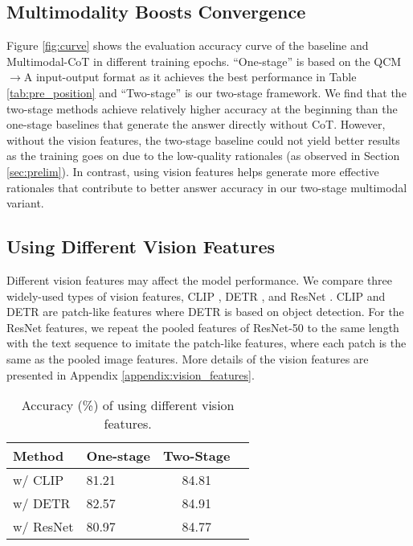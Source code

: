 \documentclass[nohyperref]{article}
\theoremstyle{plain}
\theoremstyle{definition}
\theoremstyle{remark}
\begin{document}
\subsection{Multimodality Boosts Convergence}
Figure \ref{fig:curve} shows the evaluation accuracy curve of the baseline and Multimodal-CoT in different training epochs. {``One-stage'' is based on the QCM$\rightarrow$A input-output format as it achieves the best performance in Table \ref{tab:pre_position} and ``Two-stage'' is our two-stage framework.} We find that the two-stage methods achieve relatively higher accuracy at the beginning than the {one-stage} baselines that generate the answer directly without CoT. However, without the vision features, the two-stage baseline could not yield better results as the training goes on due to the low-quality rationales (as observed in Section \ref{sec:prelim}). In contrast, 
using vision features helps generate more effective rationales that contribute to better answer accuracy in our two-stage multimodal variant.


\subsection{Using Different Vision Features}\label{sec:vision_features}
Different vision features may affect the model performance. We compare three widely-used types of vision features, CLIP \citep{radford2021learning}, DETR \citep{carion2020end}, and ResNet \citep{he2016deep}. CLIP and DETR are patch-like features where DETR is based on object detection. For the ResNet features, we repeat the pooled features of ResNet-50 to the same length with the text sequence to imitate the patch-like features, where each patch is the same as the pooled image features. More details of the vision features are presented in Appendix \ref{appendix:vision_features}.

\begin{table}[htb]
\vspace{-3.6mm}
    \centering\small
        \caption{Accuracy (\%) of using different vision features. \label{tab:visual_features}}
   \setlength{\tabcolsep}{10pt}
\begin{tabular}{llcc}\toprule
 {Method}  & {One-stage} & {Two-Stage}\\\midrule
\quad w/ CLIP  & 81.21 & 84.81\\
 \quad w/ DETR  & 82.57 & 84.91\\
 \quad w/ ResNet & 80.97 & 84.77\\
\bottomrule
\end{tabular}
\vspace{-3.6mm}
\end{table}
\end{document}
